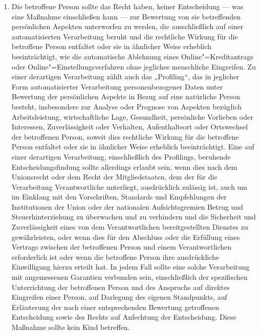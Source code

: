 \begin{enumerate}
   \item Die betroffene Person sollte das Recht haben, keiner Entscheidung — was eine Maßnahme einschließen kann — zur
    Bewertung von sie betreffenden persönlichen Aspekten unterworfen zu werden, die ausschließlich auf einer
    automatisierten Verarbeitung beruht und die rechtliche Wirkung für die betroffene Person entfaltet oder sie in
    ähnlicher Weise erheblich beeinträchtigt, wie die automatische Ablehnung eines Online"=Kreditantrags oder
    Online"=Einstellungsverfahren ohne jegliches menschliche Eingreifen. Zu einer derartigen Verarbeitung zählt auch
    das „Profiling“, das in jeglicher Form automatisierter Verarbeitung personenbezogener Daten unter Bewertung der
    persönlichen Aspekte in Bezug auf eine natürliche Person besteht, insbesondere zur Analyse oder Prognose von
    Aspekten bezüglich Arbeitsleistung, wirtschaftliche Lage, Gesundheit, persönliche Vorlieben oder Interessen,
    Zuverlässigkeit oder Verhalten, Aufenthaltsort oder Ortswechsel der betroffenen Person, soweit dies rechtliche
    Wirkung für die betroffene Person entfaltet oder sie in ähnlicher Weise erheblich beeinträchtigt. Eine auf einer
    derartigen Verarbeitung, einschließlich des Profilings, beruhende Entscheidungsfindung sollte allerdings erlaubt
    sein, wenn dies nach dem Unionsrecht oder dem Recht der Mitgliedstaaten, dem der für die Verarbeitung
    Verantwortliche unterliegt, ausdrücklich zulässig ist, auch um im Einklang mit den Vorschriften, Standards und
    Empfehlungen der Institutionen der Union oder der nationalen Aufsichtsgremien Betrug und Steuerhinterziehung zu
    überwachen und zu verhindern und die Sicherheit und Zuverlässigkeit eines von dem Verantwortlichen bereitgestellten
    Dienstes zu gewährleisten, oder wenn dies für den Abschluss oder die Erfüllung eines Vertrags zwischen der
    betroffenen Person und einem Verantwortlichen erforderlich ist oder wenn die betroffene Person ihre ausdrückliche
    Einwilligung hierzu erteilt hat. In jedem Fall sollte eine solche Verarbeitung mit angemessenen Garantien verbunden
    sein, einschließlich der spezifischen Unterrichtung der betroffenen Person und des Anspruchs auf direktes
    Eingreifen einer Person, auf Darlegung des eigenen Standpunkts, auf Erläuterung der nach einer entsprechenden
    Bewertung getroffenen Entscheidung sowie des Rechts auf Anfechtung der Entscheidung. Diese Maßnahme sollte kein
    Kind betreffen. 


\end{enumerate}
